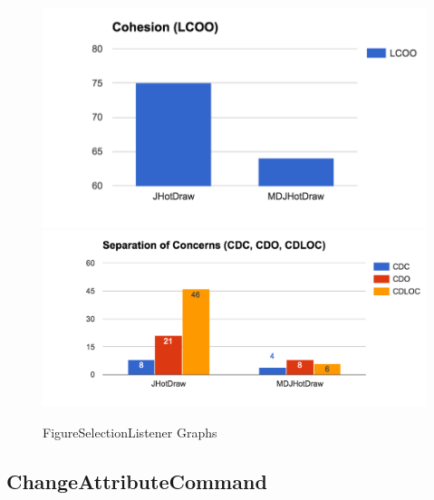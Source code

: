 \begin{figure}[H]
	\includegraphics[scale=0.5]{figures/metrics/Metric_Observer_Cohesion.png}
	\includegraphics[scale=0.45]{figures/metrics/Metric_Observer_SoC.png}
	\caption{FigureSelectionListener Graphs}
	\label{Fig:FigureSelectionListener Graphs}
\end{figure}

\subsection{ChangeAttributeCommand}


